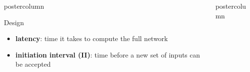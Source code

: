 \documentclass[final,hyperref={pdfpagelabels=false}]{beamer}
\newlength{\columnheight}
\begin{document}
\begin{frame}
\begin{columns}
\begin{column}{.49\textwidth}
\begin{beamercolorbox}[center,wd=\textwidth]{postercolumn}
\begin{minipage}[T]{.95\textwidth}
{\begin{block}{Design}
\begin{itemize}
                \item {\bf latency}: time it takes to compute the full network
                \item {\bf initiation interval (II)}: time before a new set of inputs can be accepted
                \end{itemize}
              \end{block}
              
                }
              \end{minipage}
            \end{beamercolorbox}
          \end{column}

    \begin{column}{.49\textwidth}
      \begin{beamercolorbox}[center,wd=\textwidth]{postercolumn}
        \begin{minipage}[T]{.95\textwidth} 
          \parbox[t][\columnheight]{\textwidth}{
            
}
\end{minipage}
\end{beamercolorbox}
\end{column}
\end{columns}
\end{frame}
\end{document}
